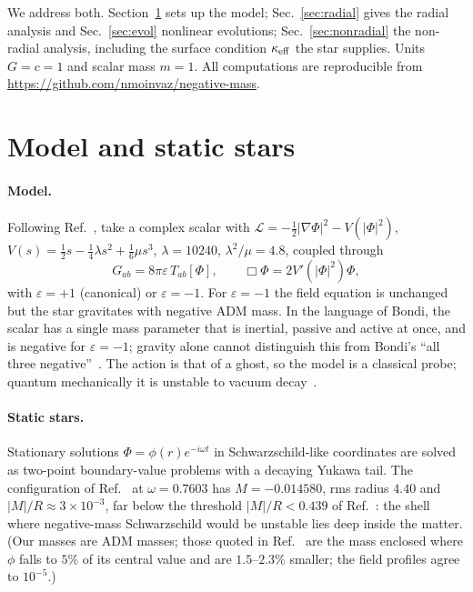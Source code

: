 \documentclass[11pt]{article}
\theoremstyle{remark}
\begin{document}
We address both. Section~\ref{sec:model} sets up the model; Sec.~\ref{sec:radial} gives the radial analysis and
Sec.~\ref{sec:evol} nonlinear evolutions; Sec.~\ref{sec:nonradial} the non-radial analysis, including the surface
condition $\kappa_{\rm eff}$ the star supplies. Units $G=c=1$ and scalar mass $m=1$. All computations are reproducible from
\url{https://github.com/nmoinvaz/negative-mass}.

\section{Model and static stars}\label{sec:model}

\paragraph{Model.} Following Ref.~\cite{Shirokov2026}, take a complex scalar with
$\mathcal L=-\tfrac12|\nabla\Phi|^2-V(|\Phi|^2)$, $V(s)=\tfrac12s-\tfrac14\lambda s^2+\tfrac16\mu s^3$, $\lambda=10240$,
$\lambda^2/\mu=4.8$, coupled through
\begin{equation}
G_{ab}=8\pi\varepsilon\,T_{ab}[\Phi],\qquad \Box\Phi=2V'(|\Phi|^2)\Phi,
\end{equation}
with $\varepsilon=+1$ (canonical) or $\varepsilon=-1$. For $\varepsilon=-1$ the field equation is unchanged but the
star gravitates with negative ADM mass. In the language of Bondi, the scalar has a single mass parameter that is
inertial, passive and active at once, and is negative for $\varepsilon=-1$; gravity alone cannot distinguish this from
Bondi's ``all three negative''~\cite{Bondi1957,Bonnor1989}. The action is that of a ghost, so the model is a classical
probe; quantum mechanically it is unstable to vacuum decay~\cite{CJM2004}.

\paragraph{Static stars.} Stationary solutions $\Phi=\phi(r)e^{-i\omega t}$ in Schwarzschild-like coordinates are
solved as two-point boundary-value problems with a decaying Yukawa tail. The configuration of Ref.~\cite{Shirokov2026}
at $\omega=0.7603$ has $M=-0.014580$, rms radius $4.40$ and $|M|/R\approx3\times10^{-3}$, far below the threshold
$|M|/R<0.439$ of Ref.~\cite{Moinvaziri2026a}: the shell where negative-mass Schwarzschild would be unstable lies deep inside the
matter. (Our masses are ADM masses; those quoted in Ref.~\cite{Shirokov2026} are the mass enclosed where $\phi$ falls to
$5\%$ of its central value and are $1.5$--$2.3\%$ smaller; the field profiles agree to $10^{-5}$.)
\end{document}
